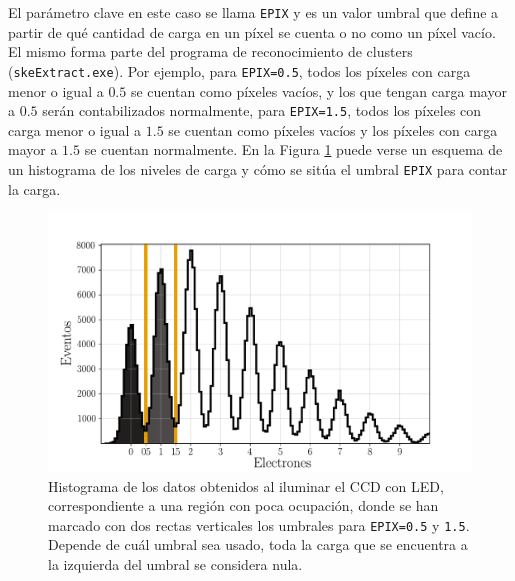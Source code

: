 El parámetro clave en este caso se llama \verb|EPIX| y es un valor umbral que define a partir de qué cantidad de carga en un píxel se cuenta o no como un píxel vacío. El mismo forma parte del programa de reconocimiento de clusters (\verb|skeExtract.exe|). Por ejemplo, para \verb|EPIX=0.5|, todos los píxeles con carga menor o igual a $0.5$ se cuentan como píxeles vacíos, y los que tengan carga mayor a $0.5$ serán contabilizados normalmente, para \verb|EPIX=1.5|, todos los píxeles con carga menor o igual a $1.5$ se cuentan como píxeles vacíos y los píxeles con carga mayor a $1.5$ se cuentan normalmente. En la Figura \ref{fig:HistogramaEPIX} puede verse un esquema de un histograma de los niveles de carga y cómo se sitúa el umbral \verb|EPIX| para contar la carga.
\begin{figure}[h]
    \centering
        \includegraphics[scale=0.5]{Figs/EsquemaEPIX_histocarga.pdf}
    \caption{Histograma de los datos obtenidos al iluminar el CCD con LED, correspondiente a una región con poca ocupación, donde se han marcado con dos rectas verticales los umbrales para \texttt{EPIX=0.5} y \texttt{1.5}. Depende de cuál umbral sea usado, toda la carga que se encuentra a la izquierda del umbral se considera nula.}
    \label{fig:HistogramaEPIX}
\end{figure}

